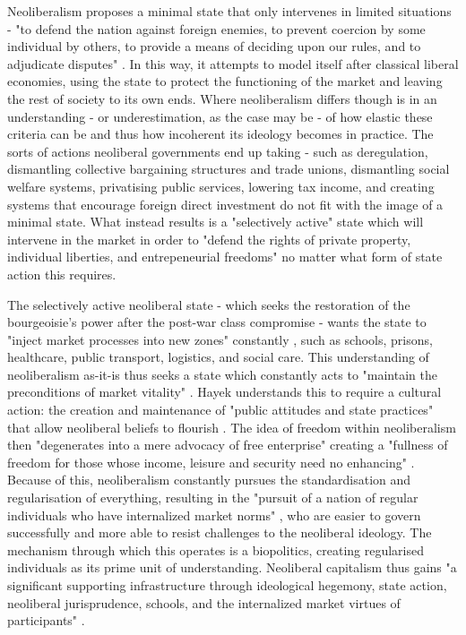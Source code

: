 Neoliberalism proposes a minimal state that only intervenes in limited situations - "to defend the nation against foreign enemies, to prevent coercion by some individual by others, to provide a means of deciding upon our rules, and to adjudicate disputes" \citep[53]{connolly_fragility_2013}. In this way, it attempts to model itself after classical liberal economies, using the state to protect the functioning of the market and leaving the rest of society to its own ends. Where neoliberalism differs though is in an understanding - or underestimation, as the case may be - of how elastic these criteria can be and thus how incoherent its ideology becomes in practice. The sorts of actions neoliberal governments end up taking - such as deregulation,
dismantling collective bargaining structures and trade unions,
dismantling social welfare systems, privatising public services,
lowering tax income, and creating systems that encourage foreign direct
investment \citep[52]{harvey_brief_2007} do not fit with the image of a minimal state. What instead results is a "selectively active" state \citep[21]{connolly_fragility_2013} which will intervene in the market in order to "defend the rights of private property, individual liberties, and entrepeneurial freedoms" \citep[49]{harvey_brief_2007} no matter what form of state action this requires.

The selectively active neoliberal state - which seeks the restoration of the bourgeoisie's power after the post-war class compromise - wants the state to "inject market processes into new zones" constantly \citep[21]{connolly_fragility_2013}, such as schools, prisons, healthcare, public transport, logistics, and social care. This understanding of neoliberalism as-it-is thus seeks a state which constantly acts to "maintain the preconditions of market vitality" \citep[60]{connolly_fragility_2013}. Hayek understands this to require a cultural action: the creation and maintenance of "public attitudes and state practices" that allow neoliberal beliefs to flourish \citep[57]{connolly_fragility_2013}. The idea of freedom within neoliberalism then "degenerates into a mere advocacy of free enterprise" creating a "fullness of freedom for those whose income, leisure and security need no enhancing" \citep[265]{polanyi_great_1944}. Because of this, neoliberalism constantly pursues the standardisation and regularisation of everything, resulting in the "pursuit of a nation of regular individuals who have internalized market norms" \citep[53]{connolly_fragility_2013}, who are easier to govern successfully and more able to resist challenges to the neoliberal ideology. The mechanism through which this operates is a biopolitics, creating regularised individuals as its prime unit of understanding. Neoliberal capitalism thus gains "a significant supporting infrastructure through ideological hegemony, state action, neoliberal jurisprudence, schools, and the internalized market virtues of participants" \citep[62]{connolly_fragility_2013}.

